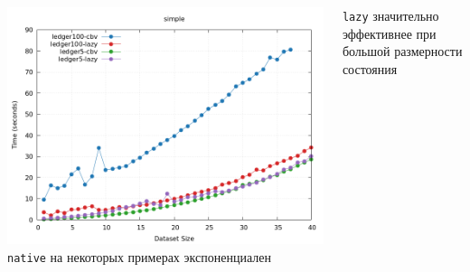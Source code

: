 \documentclass{beamer}
\begin{document}
\begin{frame}
  \begin{columns}
    \includegraphics[width=\textwidth]{ledger_size.png}
  \small
  \texttt{native} на некоторых примерах экспоненциален
  \bigskip

  \texttt{lazy} значительно эффективнее при большой размерности состояния
  \end{columns}
  \end{frame}
\end{document}
